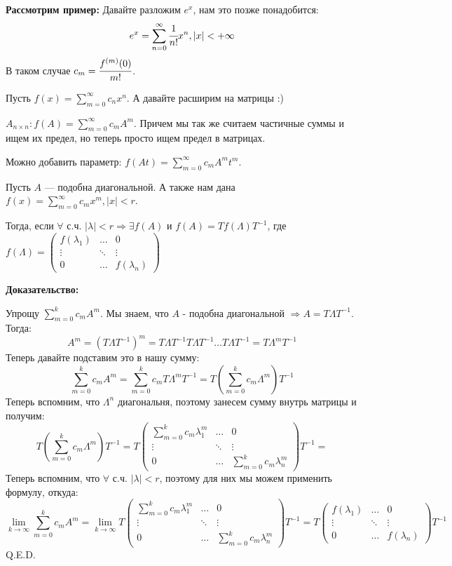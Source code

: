 \textbf{Рассмотрим пример:} Давайте разложим $e^x$, нам это позже понадобится:
$$e^x = \sum\limits_{n=0}^\infty\cfrac{1}{n!}x^n, |x| < + \infty$$
В таком случае $c_m = \cfrac{f^{(m)}(0)}{m!}$.

Пусть $f(x) = \sum\limits_{m=0}^\infty c_n x^n$. А давайте расширим на матрицы :)

 $A_{n\times n}: f(A) = \sum\limits_{m=0}^\infty c_mA^m$. Причем мы так же считаем частичные суммы и ищем их предел, но теперь просто ищем предел в матрицах.

Можно добавить параметр: $f(At) = \sum\limits_{m=0}^\infty c_mA^mt^m$.




Пусть $A$ --- подобна диагональной. А также нам дана $f(x) = \sum\limits_{m=0}^\infty c_m x^m, |x|<r$.

Тогда, если $\forall$ с.ч. $|\lambda|< r \Rightarrow \exists f(A)$ и $f(A) = T f(\Lambda) T^{-1}$, где
$f(\Lambda) = \begin{pmatrix}
    f(\lambda_1) & \ldots & 0\\
    \vdots & \ddots & \vdots \\
    0 & \ldots &f(\lambda_n)
\end{pmatrix}$

\textbf{Доказательство:}

Упрощу $\sum\limits_{m=0}^k    c_m A^m$. Мы знаем, что $A$ - подобна диагональной $ \Rightarrow A = T \Lambda T^{-1}$.  Тогда:
$$A^m = (T \Lambda T^{-1})^m = T \Lambda T^{-1} T \Lambda T^{-1} \ldots T \Lambda T^{-1} = T \Lambda^m T^{-1}$$
Теперь давайте подставим это в нашу сумму:
$$\sum\limits_{m=0}^k c_m A^m = \sum\limits_{m=0}^k c_mT \Lambda^m T^{-1} = T\left(\sum\limits_{m=0}^k c_m\Lambda^m\right)   T^{-1}$$
Теперь вспомним, что $\Lambda^n$ диагональня, поэтому занесем сумму внутрь матрицы и получим:
$$T\left(\sum\limits_{m=0}^k c_m\Lambda^m\right) T^{-1} = T \begin{pmatrix}
    \sum\limits_{m=0}^k c_m\lambda_1^m & \ldots & 0 \\
    \vdots  & \ddots & \vdots \\
    0 & \ldots & \sum\limits_{m=0}^k c_m\lambda_n^m
\end{pmatrix}T^{-1} =$$
Теперь вспомним, что $\forall$ с.ч. $|\lambda|< r$, поэтому для них мы можем применить формулу, откуда:
$$\lim\limits_{k\rightarrow\infty}\sum\limits_{m=0}^k    c_m A^m=\lim\limits_{k\rightarrow\infty} T \begin{pmatrix}
    \sum\limits_{m=0}^k c_m\lambda_1^m & \ldots & 0 \\
    \vdots  & \ddots & \vdots \\
    0 & \ldots & \sum\limits_{m=0}^k c_m\lambda_n^m
\end{pmatrix}T^{-1} =T \begin{pmatrix}
    f(\lambda_1) & \ldots & 0 \\
    \vdots  & \ddots & \vdots \\
    0 & \ldots &  f(\lambda_n)
\end{pmatrix}T^{-1}$$
  \hfill Q.E.D.

